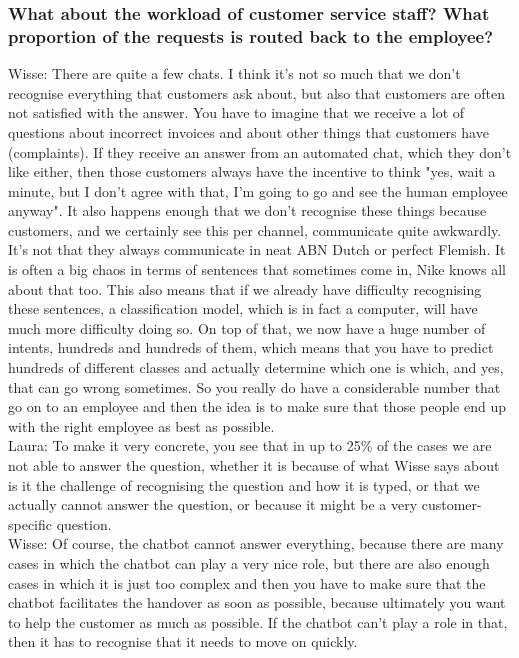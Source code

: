 \begin{appendices}
	\subsubsection{What about the workload of customer service staff?
		What proportion of the requests is routed back to the employee?}
	Wisse: There are quite a few chats. I think it's not so much that we don't recognise everything that customers ask about, but also that customers are often not satisfied with the answer. You have to imagine that we receive a lot of questions about incorrect invoices and about other things that customers have (complaints). If they receive an answer from an automated chat, which they don't like either, then those customers always have the incentive to think "yes, wait a minute, but I don't agree with that, I'm going to go and see the human employee anyway". It also happens enough that we don't recognise these things because customers, and we certainly see this per channel, communicate quite awkwardly. It's not that they always communicate in neat ABN Dutch or perfect Flemish. It is often a big chaos in terms of sentences that sometimes come in, Nike knows all about that too. This also means that if we already have difficulty recognising these sentences, a classification model, which is in fact a computer, will have much more difficulty doing so. On top of that, we now have a huge number of intents, hundreds and hundreds of them, which means that you have to predict hundreds of different classes and actually determine which one is which, and yes, that can go wrong sometimes. So you really do have a considerable number that go on to an employee and then the idea is to make sure that those people end up with the right employee as best as possible.\\
	\break
	Laura: To make it very concrete, you see that in up to 25\% of the cases we are not able to answer the question, whether it is because of what Wisse says about is it the challenge of recognising the question and how it is typed, or that we actually cannot answer the question, or because it might be a very customer-specific question.\\
	\break
	Wisse: Of course, the chatbot cannot answer everything, because there are many cases in which the chatbot can play a very nice role, but there are also enough cases in which it is just too complex and then you have to make sure that the chatbot facilitates the handover as soon as possible, because ultimately you want to help the customer as much as possible. If the chatbot can't play a role in that, then it has to recognise that it needs to move on quickly.
	

\end{appendices}
